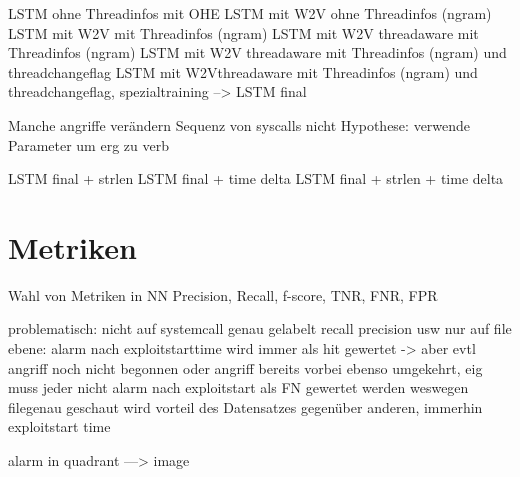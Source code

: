 LSTM ohne Threadinfos mit OHE
LSTM mit W2V ohne Threadinfos (ngram)
LSTM mit W2V mit Threadinfos (ngram)
LSTM mit W2V threadaware mit Threadinfos (ngram)
LSTM mit W2V threadaware mit Threadinfos (ngram) und threadchangeflag
LSTM mit W2Vthreadaware mit Threadinfos (ngram) und threadchangeflag, spezialtraining
--> LSTM final

Manche angriffe verändern Sequenz von syscalls nicht
Hypothese:
verwende Parameter um erg zu verb

LSTM final + strlen
LSTM final + time delta
LSTM final + strlen + time delta


\section{Metriken}

Wahl von Metriken in NN
Precision, Recall, f-score, TNR, FNR, FPR

problematisch:
nicht auf systemcall genau gelabelt
recall precision usw nur auf file ebene:
alarm nach exploitstarttime wird immer als hit gewertet -> aber evtl angriff noch nicht begonnen
oder angriff bereits vorbei
ebenso umgekehrt, eig muss jeder nicht alarm nach exploitstart als FN gewertet werden
weswegen filegenau geschaut wird
vorteil des Datensatzes gegenüber anderen, immerhin exploitstart time

alarm in quadrant ---> image



